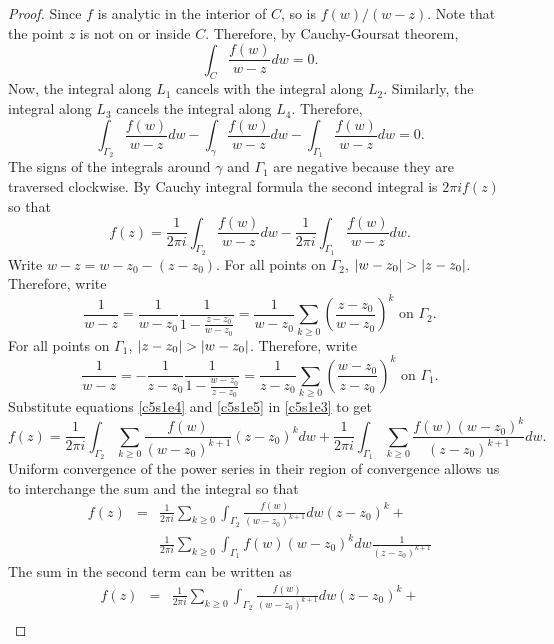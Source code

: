 \begin{proof}
Since $f$ is analytic in the interior of $C$, so is $f(w)/(w - z)$. Note that
the point $z$ is not on or inside $C$. Therefore, by Cauchy-Goursat theorem,
\[
\int_C \frac{f(w)}{w - z}dw = 0.
\]
Now, the integral along $L_1$ cancels with the integral along $L_2$. Similarly,
the integral along $L_3$ cancels the integral along $L_4$. Therefore,
\[
\int_{\Gamma_2}\frac{f(w)}{w - z}dw - \int_\gamma\frac{f(w)}{w - z}dw - 
\int_{\Gamma_1}\frac{f(w)}{w - z}dw  = 0.
\]
The signs of the integrals around $\gamma$ and $\Gamma_1$ are negative because 
they are traversed clockwise. By Cauchy integral formula the second integral is
$2\pi if(z)$ so that
\begin{equation}\label{c5s1e3}
f(z) = \frac{1}{2\pi i}\int_{\Gamma_2}\frac{f(w)}{w - z}dw - 
\frac{1}{2\pi i}\int_{\Gamma_1}\frac{f(w)}{w - z}dw.
\end{equation}
Write $w - z = w - z_0 - (z - z_0)$. For all points on $\Gamma_2$, $\left\vert{w-z_0}\right\vert
> \left\vert{z - z_0}\right\vert$. Therefore, write
\begin{equation}\label{c5s1e4}
\frac{1}{w-z} = \frac{1}{w-z_0}\frac{1}{1 - \frac{z - z_0}{w - z_0}} = 
\frac{1}{w - z_0}\sum_{k \ge 0}\left(\frac{z - z_0}{w - z_0}\right)^k 
\text{ on } \Gamma_2.
\end{equation}
For all points on $\Gamma_1$, $\left\vert{z - z_0}\right\vert > \left\vert{w - z_0}\right\vert$. Therefore, write
\begin{equation}\label{c5s1e5}
\frac{1}{w-z} = -\frac{1}{z-z_0}\frac{1}{1 - \frac{w - z_0}{z - z_0}} = 
\frac{1}{z - z_0}\sum_{k \ge 0}\left(\frac{w - z_0}{z - z_0}\right)^k 
\text{ on } \Gamma_1.
\end{equation}
Substitute equations \eqref{c5s1e4} and \eqref{c5s1e5} in \eqref{c5s1e3} to get
\[
f(z) = \frac{1}{2\pi i}
\int_{\Gamma_2}\sum_{k \ge 0}\frac{f(w)}{(w-z_0)^{k+1}}(z - z_0)^k dw
+ \frac{1}{2\pi i}
\int_{\Gamma_1}\sum_{k \ge 0}\frac{f(w)(w - z_0)^k}{(z - z_0)^{k+1}}dw.
\]
Uniform convergence of the power series in their region of convergence allows
us to interchange the sum and the integral so that
\begin{eqnarray*}
f(z) &=& \frac{1}{2\pi i} 
\sum_{k \ge 0}\int_{\Gamma_2}\frac{f(w)}{(w - z_0)^{k+1}}dw (z-z_0)^k + \\
& & \frac{1}{2\pi i} 
\sum_{k \ge 0}\int_{\Gamma_1}f(w)(w - z_0)^kdw \frac{1}{(z - z_0)^{k+1}}
\end{eqnarray*}
The sum in the second term can be written as
\begin{eqnarray*}
f(z) &=& \frac{1}{2\pi i} 
\sum_{k \ge 0}\int_{\Gamma_2}\frac{f(w)}{(w - z_0)^{k+1}}dw (z-z_0)^k + \\

\end{eqnarray*}
\end{proof}
